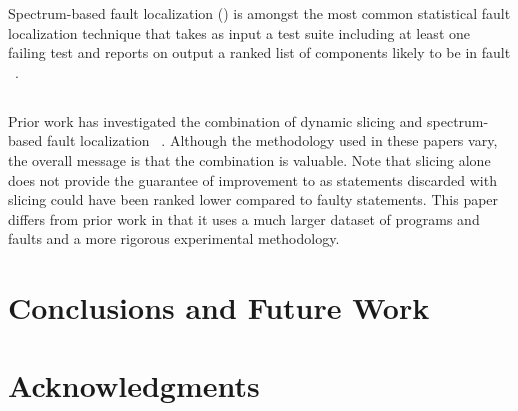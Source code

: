 \documentclass{article}
\begin{document}
Spectrum-based fault localization (\sfl) is amongst the most common statistical
fault localization technique that takes as input a test suite including at least
one failing test and reports on output a ranked list of components likely to be
in fault ~\cite{FLSurvey2016,DBLP:conf/kbse/JonesH05,DBLP:journals/smr/LuciaLJTB14,DBLP:journals/jss/AbreuZGG09}.

\subsection{\comb{}}

Prior work has investigated the combination of dynamic slicing and
spectrum-based fault
localization ~\cite{Wotawa:2010:FLB:1848650.1849235,Alves:2011:FUD:2190078.2190115,DBLP:conf/ecai/HoferW12,lei-mao-dai-wang-2012,slicing-sfl-repair}. Although
the methodology used in these papers vary, the overall message is that
the combination is valuable. Note that slicing alone does not provide
the guarantee of improvement to \sfl{} as statements discarded with
slicing could have been ranked lower compared to faulty
statements. This paper differs from prior work in that it uses a much
larger dataset of programs and faults and a more rigorous experimental
methodology.


\section{Conclusions and Future Work}\label{sec:conc}



\section*{Acknowledgments}



{
  \small
  \balance
  
  
}
\end{document}
